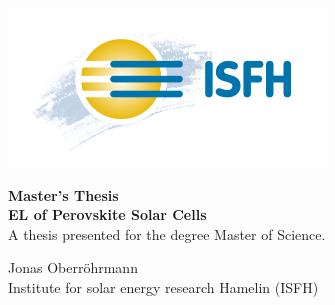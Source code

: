 \begin{titlepage}
\begin{center}
	

\begin{minipage}[t]{0.05\linewidth}
	
\end{minipage}
\hfill
\begin{minipage}[t]{0.4\linewidth}
	\includegraphics[width=\linewidth]{Images/titlepage/isfh_logo}
\end{minipage}
\vspace{1.5cm}

\huge
\textbf{Master's Thesis} \\
\vspace{0.5cm}
\large
\textbf{EL of Perovskite Solar Cells}\\

A thesis presented for the degree Master of Science.
\vfill

Jonas Oberröhrmann \\
Institute for solar energy research Hamelin (ISFH)

\pagestyle{empty} %
\setcounter{page}{0} %

\end{center}	
\end{titlepage}

\newpage 

